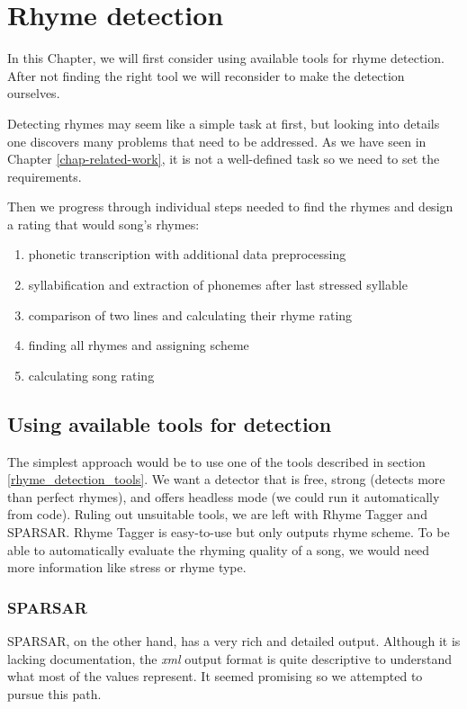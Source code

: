 
\chapter{Rhyme detection}\label{chap-rhyme-analysis}
In this Chapter, we will first consider using available tools for rhyme detection. After not finding the right tool we will reconsider to make the detection ourselves.

Detecting rhymes may seem like a simple task at first, but looking into details one discovers many problems that need to be addressed. As we have seen in Chapter \ref{chap-related-work}, it is not a well-defined task so we need to set the requirements.

Then we progress through individual steps needed to find the rhymes and design a rating that would  song's rhymes:


\begin{enumerate}
	\item phonetic transcription with additional data preprocessing
	\item syllabification and extraction of phonemes after last stressed syllable
	\item comparison of two lines and calculating their rhyme rating
	\item finding all rhymes and assigning  scheme
	\item calculating song rating
\end{enumerate}

\section{Using available tools for detection}
The simplest approach would be to use one of the tools described in section \ref{rhyme_detection_tools}. We want a detector that is free, strong (detects more than perfect rhymes), and offers headless mode (we could run it automatically from code). Ruling out unsuitable tools, we are left with Rhyme Tagger and SPARSAR. Rhyme Tagger is easy-to-use but only outputs rhyme scheme. To be able to automatically evaluate the rhyming quality of a song, we would need more information like stress or rhyme type.

\subsection*{SPARSAR}
SPARSAR, on the other hand, has a very rich and detailed output. Although it is lacking documentation, the \textit{xml} output format is quite descriptive to understand what most of the values represent. It seemed promising so we attempted to pursue this path.


